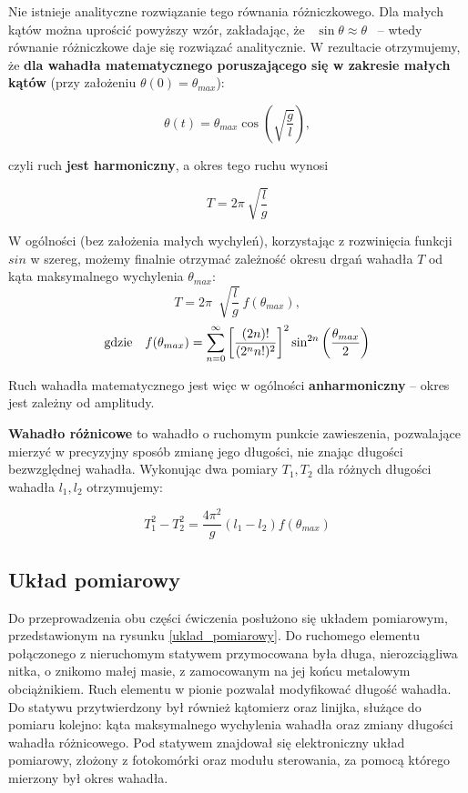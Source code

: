 \documentclass[a4paper]{article}
\newlength{\du}
\begin{document}
Nie istnieje analityczne rozwiązanie tego równania różniczkowego. Dla małych kątów
można uprościć powyższy wzór, zakładając, że \, $\sin\theta \approx \theta$ \,
-- wtedy równanie różniczkowe daje się rozwiązać analitycznie. W rezultacie otrzymujemy,
że \textbf{dla wahadła matematycznego poruszającego się w zakresie małych kątów}
(przy założeniu $\theta(0) = \theta_{max}$):

\[ \theta(t) = \theta_{max}\cos\left(\sqrt{\frac{g}{l}}\right), \] 

czyli ruch \textbf{jest harmoniczny}, a okres tego ruchu wynosi

\[ T = 2\pi~\sqrt{\frac{l}{g}} \]


W ogólności (bez założenia małych wychyleń), korzystając z rozwinięcia funkcji $sin$
w szereg, możemy finalnie otrzymać zależność okresu drgań wahadła $T$ od kąta
maksymalnego wychylenia $\theta_{max}$:
\begin{equation} \label{eq:T}
T = 2\pi ~ \sqrt[]{\frac{l}{g}}~f(\theta_{max}) ,
\end{equation}
\begin{equation} \label{eq:f}
\text{gdzie} \enskip  \enskip f(\theta_{max}) = 
	\sum\limits_{n=0}^{\infty} 
		\left[ \frac{(2n)!}{(2^nn!)^2} \right]^2 
			\sin^{2n}\left(\frac{\theta_{max}}{2} \right)
\end{equation}


Ruch wahadła matematycznego jest więc w ogólności \textbf{anharmoniczny} -- okres
jest zależny od amplitudy.

\textbf{Wahadło różnicowe} to wahadło o ruchomym punkcie zawieszenia, pozwalające
mierzyć w precyzyjny sposób zmianę jego długości, nie znając długości bezwzględnej
wahadła. Wykonując dwa pomiary $T_1, T_2$ dla różnych długości wahadła $l_1, l_2$ otrzymujemy:

\[ T^2_1 - T^2_2 = \frac{4\pi ^2}{g}\left(l_1-l_2\right) f(\theta_{max}) \]

\subsection{Układ pomiarowy}
Do przeprowadzenia obu części ćwiczenia posłużono się układem pomiarowym,
przedstawionym na rysunku \ref{uklad_pomiarowy}. Do ruchomego elementu 
połączonego z nieruchomym statywem przymocowana była długa, nierozciągliwa nitka, 
o znikomo małej masie, z zamocowanym na jej końcu metalowym obciążnikiem. 
Ruch elementu w pionie pozwalał modyfikować długość wahadła. Do statywu 
przytwierdzony był również kątomierz oraz linijka, służące do pomiaru kolejno:
kąta maksymalnego wychylenia wahadła oraz zmiany długości wahadła różnicowego.
Pod statywem znajdował się elektroniczny układ pomiarowy, złożony z fotokomórki
oraz modułu sterowania, za pomocą którego mierzony był okres wahadła.
\end{document}
